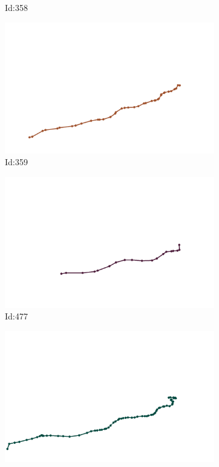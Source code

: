 \documentclass[12pt,twoside]{report}
\begin{document}
\begin{figure}
\begin{subfigure}[b]{0.20\textwidth}
\caption{Id:358}
\end{subfigure}
\begin{subfigure}[b]{0.20\textwidth}
\centering
\includegraphics[width=\textwidth]{../../trajectories/359.png}
\caption{Id:359}
\end{subfigure}
\begin{subfigure}[b]{0.20\textwidth}
\centering
\includegraphics[width=\textwidth]{../../trajectories/477.png}
\caption{Id:477}
\end{subfigure}
\begin{subfigure}[b]{0.20\textwidth}
\centering
\includegraphics[width=\textwidth]{../../trajectories/601.png}

\end{subfigure}
\end{figure}
\end{document}
